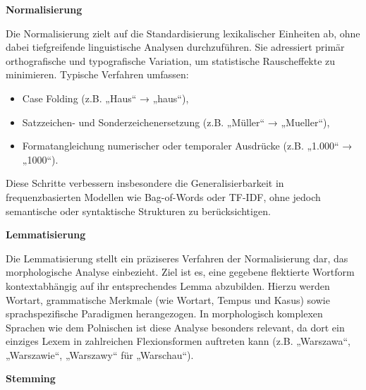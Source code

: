 \textbf{Normalisierung}

Die Normalisierung zielt auf die Standardisierung lexikalischer Einheiten ab, ohne dabei tiefgreifende linguistische Analysen durchzuführen. Sie adressiert primär orthografische und typografische Variation, um statistische Rauscheffekte zu minimieren. Typische Verfahren umfassen:

\begin{itemize}
    \item Case Folding (z.B. „Haus“ → „haus“),
    \item Satzzeichen- und Sonderzeichenersetzung (z.B. „Müller“ → „Mueller“),
    \item Formatangleichung numerischer oder temporaler Ausdrücke (z.B. „1.000“ → „1000“).
\end{itemize}

Diese Schritte verbessern insbesondere die Generalisierbarkeit in frequenzbasierten Modellen wie Bag-of-Words oder TF-IDF, ohne jedoch semantische oder syntaktische Strukturen zu berücksichtigen.

\textbf{Lemmatisierung}

Die Lemmatisierung stellt ein präziseres Verfahren der Normalisierung dar, das morphologische Analyse einbezieht. Ziel ist es, eine gegebene flektierte Wortform kontextabhängig auf ihr entsprechendes Lemma abzubilden. Hierzu werden Wortart, grammatische Merkmale (wie Wortart, Tempus und Kasus) sowie sprachspezifische Paradigmen herangezogen. In morphologisch komplexen Sprachen wie dem Polnischen ist diese Analyse besonders relevant, da dort ein einziges Lexem in zahlreichen Flexionsformen auftreten kann (z.B. „Warszawa“, „Warszawie“, „Warszawy“ für „Warschau“).


\textbf{Stemming}


